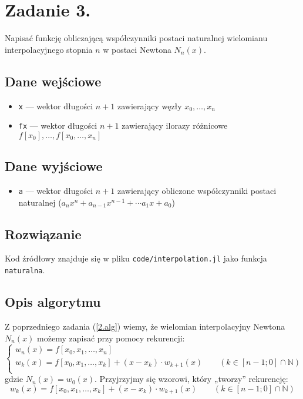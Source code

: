 \documentclass[10pt]{article}
\begin{document}
\section{Zadanie 3.}

Napisać funkcję obliczającą współczynniki postaci naturalnej wielomianu interpolacyjnego stopnia $n$ w postaci Newtona $N_n(x)$.

\subsection{Dane wejściowe}

\begin{itemize}
    \item \texttt{x} — wektor długości $n+1$ zawierający węzły $x_0,\dots,x_n$
    \item \texttt{fx} — wektor długości $n+1$ zawierający ilorazy różnicowe $f[x_0], \dots, f[x_0,\dots,x_n]$
\end{itemize}

\subsection{Dane wyjściowe}

\begin{itemize}
    \item \texttt{a} — wektor długości $n+1$ zawierający obliczone współczynniki postaci naturalnej ($a_n x^n + a_{n-1} x^{n-1} + \cdots a_1 x + a_0$)
\end{itemize}

\subsection{Rozwiązanie}

Kod źródłowy znajduje się w pliku \texttt{code/interpolation.jl} jako funkcja \texttt{naturalna}.

\subsection{Opis algorytmu}

Z poprzedniego zadania (\ref{2.alg}) wiemy, że wielomian interpolacyjny Newtona $N_n(x)$ możemy zapisać przy pomocy rekurencji:
$$
\begin{cases}
    w_n(x) = f[x_0,x_1,\dots,x_n]\\
    w_k(x) = f[x_0,x_1,\dots,x_k] + (x-x_k) \cdot w_{k+1}(x) \qquad (k \in [n-1;0] \cap \mathbb{N})\\
\end{cases}
$$
gdzie $N_n(x) = w_0(x)$. Przyjrzyjmy się wzorowi, który „tworzy” rekurencję:
$$
w_k(x) = f[x_0,x_1,\dots,x_k] + (x-x_k) \cdot w_{k+1}(x) \qquad (k \in [n-1;0] \cap \mathbb{N})
$$
\end{document}
